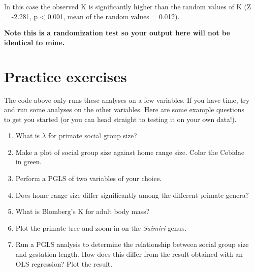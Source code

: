 \documentclass[12pt]{article}
\begin{document}
In this case the observed K is significantly higher than the random values of K (Z = -2.281, p < 0.001, mean of the random values = 0.012). 

\textbf{Note this is a randomization test so your output here will not be identical to mine.}

\section{Practice exercises}
The code above only runs these analyses on a few variables. If you have time, try and run some analyses on the other variables. Here are some example questions to get you started (or you can head straight to testing it on your own data!).

\begin{enumerate}
\item What is $\lambda$ for primate social group size?
\item Make a plot of social group size against home range size. Color the Cebidae in green. 
\item Perform a PGLS of two variables of your choice.
\item Does home range size differ significantly among the different primate genera?
\item What is Blomberg’s K for adult body mass?
\item Plot the primate tree and zoom in on the \textit{Saimiri} genus.
\item Run a PGLS analysis to determine the relationship between social group size and gestation length. How does this differ from the result obtained with an OLS regression? Plot the result.
\end{enumerate}
\end{document}
